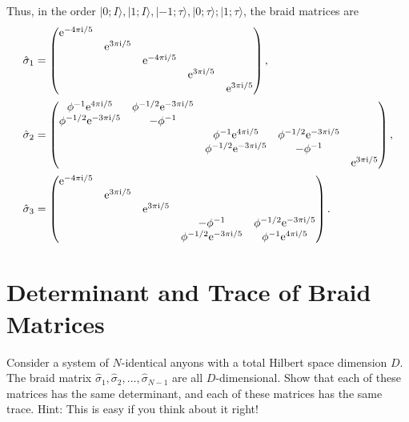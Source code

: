 \documentclass{book}
\begin{document}
Thus, in the order $|0;I \rangle ,|1;I \rangle ,|-1;\tau \rangle ,|0;\tau \rangle ;|1;\tau \rangle $, the braid matrices are
\begin{align}
\hat{\sigma }_{1} & =\begin{pmatrix}
\mathrm{e}^{-4\pi \mathrm{i} /5} &  &  &  & \\
 & \mathrm{e}^{3\pi \mathrm{i} /5} &  &  & \\
 &  & \mathrm{e}^{-4\pi \mathrm{i} /5} &  & \\
 &  &  & \mathrm{e}^{3\pi \mathrm{i} /5} & \\
 &  &  &  & \mathrm{e}^{3\pi \mathrm{i} /5}
\end{pmatrix} ,\notag\\
\hat{\sigma }_{2} & =\begin{pmatrix}
\phi ^{-1}\mathrm{e}^{4\pi \mathrm{i} /5} & \phi ^{-1/2}\mathrm{e}^{-3\pi \mathrm{i} /5} &  &  & \\
\phi ^{-1/2}\mathrm{e}^{-3\pi \mathrm{i} /5} & -\phi ^{-1} &  &  & \\
 &  & \phi ^{-1}\mathrm{e}^{4\pi \mathrm{i} /5} & \phi ^{-1/2}\mathrm{e}^{-3\pi \mathrm{i} /5} & \\
 &  & \phi ^{-1/2}\mathrm{e}^{-3\pi \mathrm{i} /5} & -\phi ^{-1} & \\
 &  &  &  & \mathrm{e}^{3\pi \mathrm{i} /5}
\end{pmatrix} ,\notag\\
\hat{\sigma }_{3} & =\begin{pmatrix}
\mathrm{e}^{-4\pi \mathrm{i} /5} &  &  &  & \\
 & \mathrm{e}^{3\pi \mathrm{i} /5} &  &  & \\
 &  & \mathrm{e}^{3\pi \mathrm{i} /5} &  & \\
 &  &  & -\phi ^{-1} & \phi ^{-1/2}\mathrm{e}^{-3\pi \mathrm{i} /5}\\
 &  &  & \phi ^{-1/2}\mathrm{e}^{-3\pi \mathrm{i} /5} & \phi ^{-1}\mathrm{e}^{4\pi \mathrm{i} /5}\label{eq:FibBraiding3}
\end{pmatrix} .
\end{align}
\section{Determinant and Trace of Braid Matrices}
Consider a system of $N$-identical anyons with a total Hilbert space dimension $D$. The braid matrix $\hat{\sigma }_{1} ,\hat{\sigma }_{2} ,\dotsc ,\hat{\sigma }_{N-1}$ are all $D$-dimensional. Show that each of these matrices has the same determinant, and each of these matrices has the same trace. Hint: This is easy if you think about it right!
\end{document}
